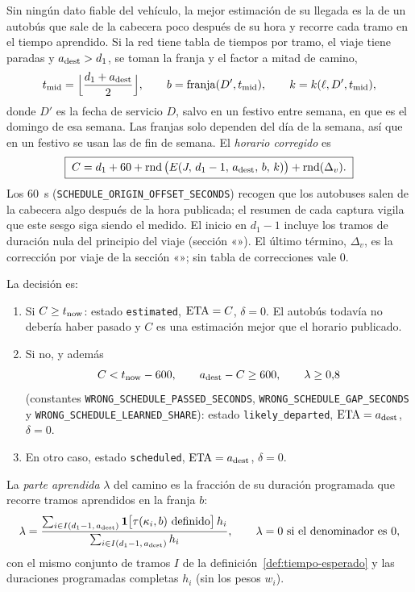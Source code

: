 Sin ningún dato fiable del vehículo, la mejor estimación de su llegada es la de un autobús que sale de la cabecera poco
después de su hora y recorre cada tramo en el tiempo aprendido. Si la red tiene tabla de tiempos por tramo, el viaje
tiene paradas y $a_{\mathrm{dest}}>d_1$, se toman la franja y el factor a mitad de camino,
\[
t_{\mathrm{mid}}=\Big\lfloor\frac{d_1+a_{\mathrm{dest}}}{2}\Big\rfloor,\qquad b=\operatorname{franja}(D',t_{\mathrm{mid}}),\qquad
k=k(\ell,D',t_{\mathrm{mid}}),
\]
donde $D'$ es la fecha de servicio $D$, salvo en un festivo entre semana, en que es el domingo de esa semana. Las
franjas solo dependen del día de la semana, así que en un festivo se usan las de fin de semana. El \emph{horario
corregido} es
\begin{equation}
\label{eq:capa3}
\boxed{\;C=d_1+60+\operatorname{rnd}\big(E(J,\,d_1-1,\,a_{\mathrm{dest}},\,b,\,k)\big)+\operatorname{rnd}(\Delta_v).\;}
\end{equation}
Los $60$~s (\texttt{SCHEDULE\_ORIGIN\_OFFSET\_SECONDS}) recogen que los autobuses salen de la cabecera algo después de
la hora publicada; el resumen de cada captura vigila que este sesgo siga siendo el medido. El inicio en $d_1-1$ incluye
los tramos de duración nula del principio del viaje (sección «»). El último término,
$\Delta_v$, es la corrección por viaje de la sección «»; sin tabla de correcciones vale 0.

La decisión es:

\begin{enumerate}
  \item Si $C\ge t_{\mathrm{now}}$: estado \texttt{estimated}, $\mathrm{ETA}=C$, $\delta=0$. El autobús todavía no debería haber pasado y
        $C$ es una estimación mejor que el horario publicado.
  \item Si no, y además
        \begin{equation}
        \label{eq:probablemente}
        C<t_{\mathrm{now}}-600,\qquad a_{\mathrm{dest}}-C\ge600,\qquad \lambda\ge0{,}8
        \end{equation}
        (constantes \texttt{WRONG\_SCHEDULE\_PASSED\_SECONDS}, \texttt{WRONG\_SCHEDULE\_GAP\_SECONDS} y
        \texttt{WRONG\_SCHEDULE\_LEARNED\_SHARE}): estado \texttt{likely\_departed}, $\mathrm{ETA}=a_{\mathrm{dest}}$, $\delta=0$.
  \item En otro caso, estado \texttt{scheduled}, $\mathrm{ETA}=a_{\mathrm{dest}}$, $\delta=0$.
\end{enumerate}

\noindent La \emph{parte aprendida} $\lambda$ del camino es la fracción de su duración programada que recorre tramos
aprendidos en la franja $b$:
\begin{equation}
\label{eq:parte-aprendida}
\lambda=\frac{\sum_{i\in I(d_1-1,\,a_{\mathrm{dest}})}\mathbf{1}\big[\tau(\kappa_i,b)\text{ definido}\big]\,h_i}{\sum_{i\in I(d_1-1,\,a_{\mathrm{dest}})}h_i},
\qquad\lambda=0\ \text{si el denominador es }0,
\end{equation}
con el mismo conjunto de tramos $I$ de la definición~\ref{def:tiempo-esperado} y las duraciones programadas completas
$h_i$ (sin los pesos $w_i$).

